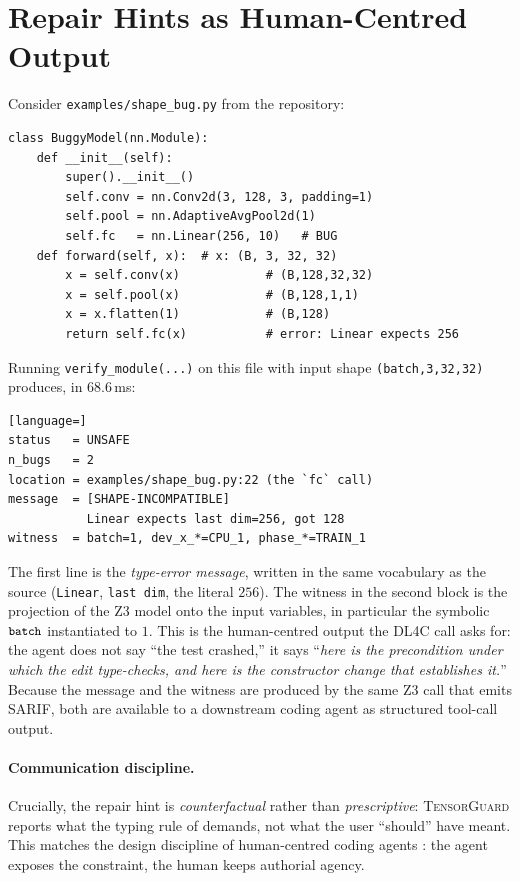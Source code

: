 \documentclass{article}
\theoremstyle{plain}
\theoremstyle{definition}
\newcommand{\TensorGuard}{\textsc{TensorGuard}}
\newcommand{\code}[1]{\texttt{\small #1}}
\begin{document}
\section{Repair Hints as Human-Centred Output}\label{sec:repair}

Consider \code{examples/shape\_bug.py} from the repository:
\begin{lstlisting}
class BuggyModel(nn.Module):
    def __init__(self):
        super().__init__()
        self.conv = nn.Conv2d(3, 128, 3, padding=1)
        self.pool = nn.AdaptiveAvgPool2d(1)
        self.fc   = nn.Linear(256, 10)   # BUG
    def forward(self, x):  # x: (B, 3, 32, 32)
        x = self.conv(x)            # (B,128,32,32)
        x = self.pool(x)            # (B,128,1,1)
        x = x.flatten(1)            # (B,128)
        return self.fc(x)           # error: Linear expects 256
\end{lstlisting}
Running \code{verify\_module(...)} on this file with input shape
\code{(batch,3,32,32)} produces, in $68.6$\,ms:
\begin{lstlisting}[language=]
status   = UNSAFE
n_bugs   = 2
location = examples/shape_bug.py:22 (the `fc` call)
message  = [SHAPE-INCOMPATIBLE]
           Linear expects last dim=256, got 128
witness  = batch=1, dev_x_*=CPU_1, phase_*=TRAIN_1
\end{lstlisting}
The first line is the \emph{type-error message}, written in the
same vocabulary as the source (\code{Linear}, \code{last dim}, the
literal $256$).  The witness in the second block is the projection
of the Z3 model onto the input variables, in particular the
symbolic $\code{batch}$ instantiated to $1$.  This is the
human-centred output the DL4C call asks for: the agent does not
say ``the test crashed,'' it says ``\emph{here is the precondition
under which the edit type-checks, and here is the constructor
change that establishes it.}''  Because the message and the
witness are produced by the same Z3 call that emits SARIF, both
are available to a downstream coding agent as structured tool-call
output.

\paragraph{Communication discipline.}  Crucially, the repair hint is
\emph{counterfactual} rather than \emph{prescriptive}: \TensorGuard{}
reports what the typing rule of  demands, not what
the user ``should'' have meant.  This matches the design discipline
of human-centred coding agents \citep{dl4c2026cfp}: the agent
exposes the constraint, the human keeps authorial agency.
\end{document}

